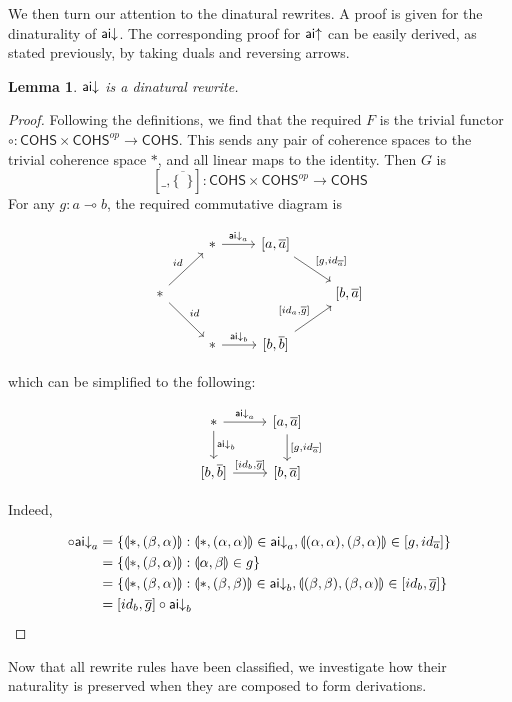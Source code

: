\documentclass[11pt, oneside]{article}
\theoremstyle{plain}
\newtheorem{lemma}[theorem]{Lemma}
\theoremstyle{definition}
\newcommand{\lp}{\llparenthesis}
\newcommand{\rp}{\rrparenthesis}
\newcommand{\cohs}{{\mathsf{COHS}}}
\newcommand{\comp}{\mathbin{\circ}}
\newcommand{\unit}{\circ}
\begin{document}
We then turn our attention to the dinatural rewrites.
A proof is given for the dinaturality of ${\mathsf {ai}}{\downarrow}$.
The corresponding proof for ${\mathsf {ai}}{ \uparrow}$ can be easily derived, as stated previously, by taking duals and reversing arrows.
\begin{lemma}
${\mathsf {ai}}{\downarrow}$ is a dinatural rewrite.
\end{lemma}
\begin{proof}
Following the definitions, we find that the required $F$ is the trivial functor $\unit:\cohs\times\cohs^{op}\to\cohs$.
This sends any pair of coherence spaces to the trivial coherence space $*$, and all linear maps to the identity.
Then $G$ is
$$[\_,\overline{\{\enspace\}}]:\cohs\times\cohs^{op}\to\cohs$$
For any $g:a\multimap b$, the required commutative diagram is

\[
\begin{tikzcd}
    & * \arrow[r,"\aiD_{a}"] & {[a,\overline{a}]} \arrow[rd,"{[g,id_{\overline{a}}]}"] \\
    * \arrow[ru,"id"] \arrow[rd,"id"] &&& {[b,\overline{a}]} \\
    & * \arrow[r,"\aiD_{b}"] & {[b,\overline{b}]} \arrow[ru,"{[id_a,\overline{g}]}"]
\end{tikzcd}
\]

which can be simplified to the following:

\[
\begin{tikzcd}
    * \arrow[r, "\aiD_{a}"]\arrow[d,"\aiD_{b}"] & {[a,\overline{a}]} \arrow[d,"{[g,id_{\overline{a}}]}"] \\
    {[b,\overline{b}]} \arrow[r,"{[id_b,\overline{g}]}"] & {[b,\overline{a}]}
\end{tikzcd}
\]

Indeed,

\begin{align*}
    [g,id_{\overline{a}}]\comp\aiD_{a} &= \{\lp*,(\beta,\alpha)\rp:\lp*,(\alpha,\alpha)\rp\in \aiD_{a},\lp(\alpha,\alpha),(\beta,\alpha)\rp\in[g,id_{\overline{a}}]\} \\
    &= \{\lp*,(\beta,\alpha)\rp:\lp\alpha,\beta\rp\in g\} \\
    &= \{\lp*,(\beta,\alpha)\rp:\lp*,(\beta,\beta)\rp\in \aiD_{b},\lp(\beta,\beta),(\beta,\alpha)\rp\in[id_{b},\overline{g}]\}\\
    &= [id_b,\overline{g}]\comp\aiD_{b}
\end{align*}
\end{proof}

Now that all rewrite rules have been classified, we investigate how their naturality is preserved when they are composed to form derivations.
\end{document}
